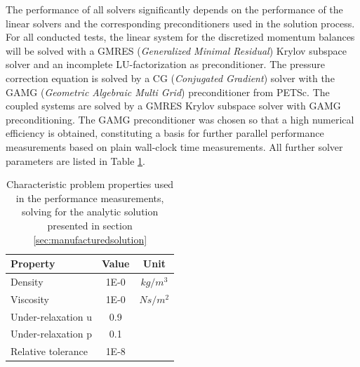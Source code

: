The performance of all solvers significantly depends on the performance of the linear solvers and the corresponding preconditioners used in the solution process. For all conducted tests, the linear system for the discretized momentum balances will be solved with a GMRES (\emph{Generalized Minimal Residual}) \cite{saad86} Krylov subspace solver and an incomplete LU-factorization as preconditioner. The pressure correction equation is solved by a CG (\emph{Conjugated Gradient}) solver \cite{hestenes52} with the GAMG (\emph{Geometric Algebraic Multi Grid}) preconditioner from PETSc. The coupled systems are solved by a GMRES Krylov subspace solver with GAMG preconditioning. The GAMG preconditioner was chosen so that a high numerical efficiency is obtained, constituting a basis for further parallel performance measurements based on plain wall-clock time measurements. All further solver parameters are listed in Table \ref{tab:performance}.

\begin{table}[h!]\centering
  \caption{Characteristic problem properties used in the performance measurements, solving for the analytic solution presented in section \ref{sec:manufacturedsolution}}
  \begin{tabular}{lcc}\toprule
    Property & Value & Unit \\
    \midrule
    \rowcolor{black!20} Density    & 1E-0 & $kg/m^3$      \\
    \rowcolor{black!00} Viscosity  & 1E-0 & $Ns/m^2$  \\
    \rowcolor{black!00} Under-relaxation u & 0.9 &  \\
    \rowcolor{black!20} Under-relaxation p & 0.1 &  \\
    \rowcolor{black!00} Relative tolerance & 1E-8&
  \end{tabular}
  \label{tab:performance}
\end{table}
 
